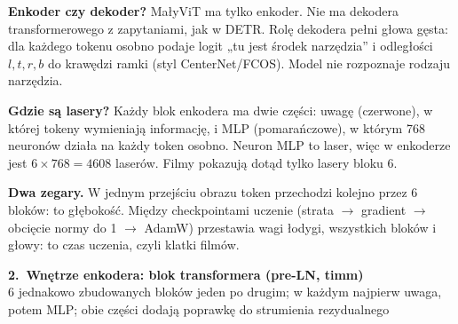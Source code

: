 \documentclass[a4paper,landscape,11pt]{article}
\begin{document}
\vspace{6mm}
\noindent
\begin{minipage}[t]{0.32\linewidth}\small
\textbf{Enkoder czy dekoder?} MałyViT ma tylko enkoder. Nie ma dekodera transformerowego z zapytaniami, jak w DETR.
Rolę dekodera pełni głowa gęsta: dla każdego tokenu osobno podaje logit „tu jest środek narzędzia” i odległości
$l,t,r,b$ do krawędzi ramki (styl CenterNet/FCOS). Model nie rozpoznaje rodzaju narzędzia.
\end{minipage}\hfill
\begin{minipage}[t]{0.32\linewidth}\small
\textbf{Gdzie są lasery?} Każdy blok enkodera ma dwie części: uwagę (czerwone), w której tokeny wymieniają informację,
i MLP (pomarańczowe), w którym 768 neuronów działa na każdy token osobno. Neuron MLP to laser, więc w enkoderze jest
$6\times768=4608$ laserów. Filmy pokazują dotąd tylko lasery bloku 6.
\end{minipage}\hfill
\begin{minipage}[t]{0.32\linewidth}\small
\textbf{Dwa zegary.} W jednym przejściu obrazu token przechodzi kolejno przez 6 bloków: to głębokość. Między checkpointami
uczenie (strata $\to$ gradient $\to$ obcięcie normy do 1 $\to$ AdamW) przestawia wagi łodygi, wszystkich bloków i głowy:
to czas uczenia, czyli klatki filmów.
\end{minipage}

\newpage
\begin{center}
{\LARGE\bfseries 2.\ Wnętrze enkodera: blok transformera (pre-LN, timm)}\\[3pt]
{\small 6 jednakowo zbudowanych bloków jeden po drugim; w każdym najpierw uwaga, potem MLP; obie części dodają poprawkę do strumienia rezydualnego}
\end{center}
\vspace{3mm}
\end{document}
